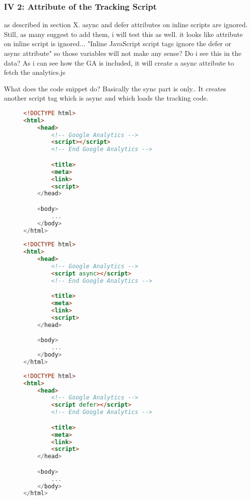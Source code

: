 \subsubsection{IV 2: Attribute of the Tracking Script}


as described in section X. async and defer attributes on inline scripts are ignored.
Still, as many suggest to add them, i will test this as well.
it looks like attribute on inline script is ignored... "Inline JavaScript script tags ignore the defer or async attribute"
so those variables will not make any sense? Do i see this in the data?
As i can see how the GA is included, it will create a async attribute to fetch the analytics.js


What does the code snippet do?
Basically the sync part is only..
It creates another script tag which is async and which loads the tracking code.


\begin{sidewaysfigure}
\begin{multicols}{3}
\begin{center}
\begin{lstlisting}[caption={Attribute 1}, language=html, numbers=none]
<!DOCTYPE html>
<html>
    <head>
        <!-- Google Analytics -->
        <script></script>
        <!-- End Google Analytics -->

        <title>
        <meta>
        <link>
        <script>
    </head>

    <body>
        ...
    </body>
</html>
\end{lstlisting}
\end{center}

\columnbreak

\begin{center}
\begin{lstlisting}[caption={Attribute 2}, language=html, numbers=none]
<!DOCTYPE html>
<html>
    <head>
        <!-- Google Analytics -->
        <script async></script>
        <!-- End Google Analytics -->

        <title>
        <meta>
        <link>
        <script>
    </head>

    <body>
        ...
    </body>
</html>
\end{lstlisting}
\end{center}

\columnbreak

\begin{center}
\begin{lstlisting}[caption={Attribute 3}, language=html, numbers=none]
<!DOCTYPE html>
<html>
    <head>
        <!-- Google Analytics -->
        <script defer></script>
        <!-- End Google Analytics -->

        <title>
        <meta>
        <link>
        <script>
    </head>

    <body>
        ...
    </body>
</html>
\end{lstlisting}
\end{center}
\end{multicols}
\end{sidewaysfigure}


